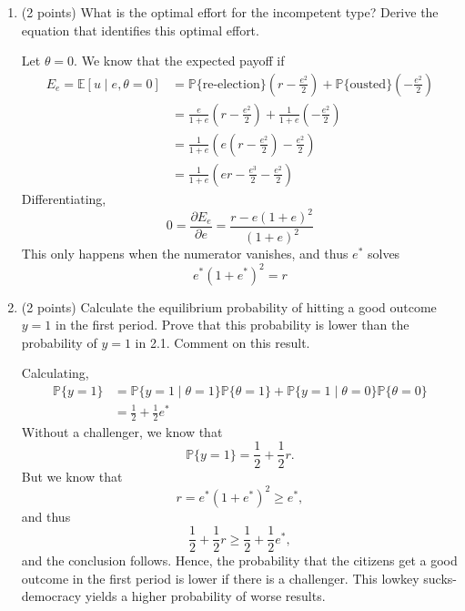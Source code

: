 \documentclass[11pt]{article}
\newcommand{\bbE}{\mathbb{E}}
\newcommand{\bbP}{\mathbb{P}}
\begin{document}
\begin{enumerate}
        \item (2 points) What is the optimal effort for the incompetent type? Derive the equation that identifies this optimal effort.
    \begin{solution}
        Let $\theta = 0.$ We know that the expected payoff if 
    \begin{align*}
    E_e = \bbE[u \mid e, \theta = 0] &= \bbP\{\text{re-election}\}(r - \frac{e^2}{2}) + \bbP\{\text{ousted}\}(-\frac{e^2}{2})\\
        &= \frac{e}{1 + e}(r - \frac{e^2}{2}) + \frac{1}{1 + e}(-\frac{e^2}{2})\\
        &= \frac{1}{1 + e}(e(r - \frac{e^2}{2}) - \frac{e^2}{2})\\
        &= \frac{1}{1 + e}\left(er - \frac{e^3}{2} - \frac{e^2}{2}\right)
    \end{align*}
    Differentiating, 
    \[0 = \frac{\partial E_e}{\partial e} = \frac{r - e(1 + e)^2}{(1 + e)^2}\] This only happens when the numerator vanishes, and thus $e^*$ solves 
    \[\boxed{e^*(1 + e^*)^2 = r}\]
    \end{solution}

        \item (2 points) Calculate the equilibrium probability of hitting a good outcome $y = 1$ in the first period. Prove that this probability is lower than the probability of $y = 1$ in 2.1. Comment on this result.
    \begin{solution}
Calculating, 
\begin{align*}
    \bbP\{y = 1\} &= \bbP\{y = 1 \mid \theta = 1\}\bbP\{\theta = 1\} + \bbP\{y = 1\mid \theta = 0\}\bbP\{\theta = 0\}\\
    &= \frac{1}{2} + \frac{1}{2}e^*
\end{align*} Without a challenger, we know that 
\[\bbP\{y = 1\} = \frac{1}{2} + \frac{1}{2}r.\] But we know that 
\[r = e^* (1 + e^*)^2 \geq e^*,\] and thus 
\[\frac{1}{2}  + \frac{1}{2}r \geq \frac{1}{2} + \frac{1}{2}e^*,\] and the conclusion follows. Hence, the probability that the citizens get a good outcome in the first period is lower if there is a challenger. This lowkey sucks-democracy yields a higher probability of worse results. 
    \end{solution}
    \end{enumerate}
\end{document}
